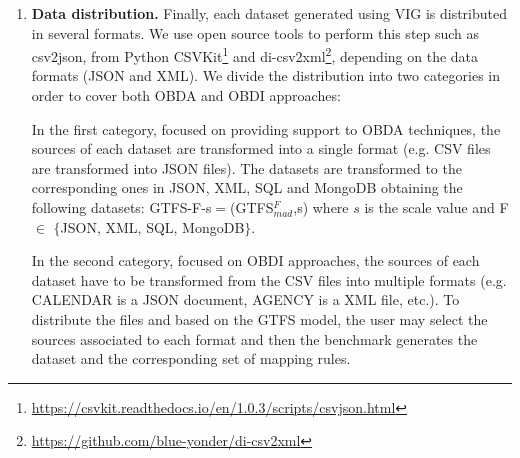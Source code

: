 \begin{enumerate}[label=\textbf{\arabic*})]
    \item \textbf{Data distribution.} Finally, each dataset generated using VIG is distributed in several formats. We use open source tools to perform this step such as csv2json, from Python CSVKit\footnote{\url{https://csvkit.readthedocs.io/en/1.0.3/scripts/csvjson.html}} and di-csv2xml\footnote{\url{https://github.com/blue-yonder/di-csv2xml}}, depending on the data formats %
    (JSON and XML). We divide the distribution into two categories in order to cover both OBDA and OBDI approaches: 
    
    In the first category, focused on providing support to OBDA techniques, the sources of each dataset are transformed into a single format (e.g. CSV files are transformed into JSON files). The datasets are transformed to the corresponding ones in JSON, XML, SQL and MongoDB obtaining the following datasets: GTFS-F-s$=$(GTFS$_{mad}^{F}$,s) where $s$ is the scale value and F $\in$ $\{$JSON, XML, SQL, MongoDB$\}$. 
    
    In the second category, focused on OBDI approaches, the sources of each dataset have to be transformed from the CSV files into multiple formats (e.g. CALENDAR is a JSON document, AGENCY is a XML file, etc.). To distribute the files and based on the GTFS model, the user may select the sources associated to each format and then the benchmark generates the dataset and the corresponding set of mapping rules. 
    

\end{enumerate}
